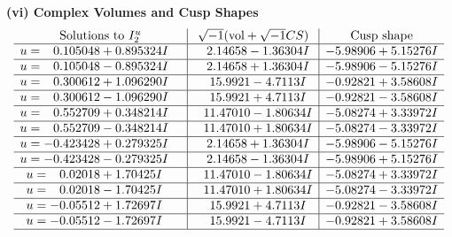 \documentclass[1p]{elsarticle_modified}
\theoremstyle{definition}
\newcommand{\I}{\sqrt{-1}}
\begin{document}
\newpage\flushleft \textbf{(vi) Complex Volumes and Cusp Shapes}
$$\begin{array}{c|c|c}  
\text{Solutions to }I^u_{2}& \I (\text{vol} + \sqrt{-1}CS) & \text{Cusp shape}\\
 \hline 
\begin{aligned}
u &= \phantom{-}0.105048 + 0.895324 I\end{aligned}
 & \phantom{-}2.14658 - 1.36304 I & -5.98906 + 5.15276 I \\ \hline\begin{aligned}
u &= \phantom{-}0.105048 - 0.895324 I\end{aligned}
 & \phantom{-}2.14658 + 1.36304 I & -5.98906 - 5.15276 I \\ \hline\begin{aligned}
u &= \phantom{-}0.300612 + 1.096290 I\end{aligned}
 & \phantom{-}15.9921 - 4.7113 I & -0.92821 + 3.58608 I \\ \hline\begin{aligned}
u &= \phantom{-}0.300612 - 1.096290 I\end{aligned}
 & \phantom{-}15.9921 + 4.7113 I & -0.92821 - 3.58608 I \\ \hline\begin{aligned}
u &= \phantom{-}0.552709 + 0.348214 I\end{aligned}
 & \phantom{-}11.47010 - 1.80634 I & -5.08274 + 3.33972 I \\ \hline\begin{aligned}
u &= \phantom{-}0.552709 - 0.348214 I\end{aligned}
 & \phantom{-}11.47010 + 1.80634 I & -5.08274 - 3.33972 I \\ \hline\begin{aligned}
u &= -0.423428 + 0.279325 I\end{aligned}
 & \phantom{-}2.14658 + 1.36304 I & -5.98906 - 5.15276 I \\ \hline\begin{aligned}
u &= -0.423428 - 0.279325 I\end{aligned}
 & \phantom{-}2.14658 - 1.36304 I & -5.98906 + 5.15276 I \\ \hline\begin{aligned}
u &= \phantom{-}0.02018 + 1.70425 I\end{aligned}
 & \phantom{-}11.47010 - 1.80634 I & -5.08274 + 3.33972 I \\ \hline\begin{aligned}
u &= \phantom{-}0.02018 - 1.70425 I\end{aligned}
 & \phantom{-}11.47010 + 1.80634 I & -5.08274 - 3.33972 I \\ \hline\begin{aligned}
u &= -0.05512 + 1.72697 I\end{aligned}
 & \phantom{-}15.9921 + 4.7113 I & -0.92821 - 3.58608 I \\ \hline\begin{aligned}
u &= -0.05512 - 1.72697 I\end{aligned}
 & \phantom{-}15.9921 - 4.7113 I & -0.92821 + 3.58608 I\\
 \hline 
 \end{array}$$\newpage
\end{document}
